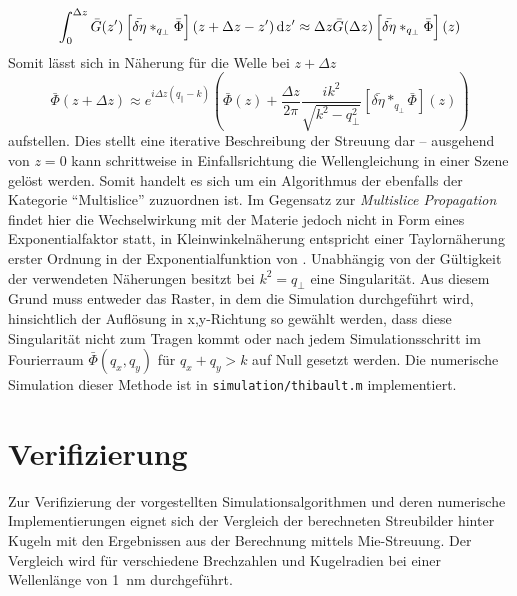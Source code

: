 \begin{equation}
	\int_{0}^{\Delta z} \bar{G}(z')\left[\bar{\delta\eta}\ast_{q_\perp} \bar{\Phi}\right](z+\Delta z-z')\dif z'
	\approx
	\Delta z \bar{G}(\Delta z)\left[\bar{\delta\eta}\ast_{q_\perp} \bar{\Phi}\right](z)
\end{equation}
Somit lässt sich in Näherung für die Welle bei $z+\Delta z$
\begin{equation}
	\label{eq:thibault}
	\bar{\Phi}(z+\Delta z)
	\approx
	e^{i\Delta z(q_\parallel-k)}
	\left(
	\bar{\Phi}(z)+\frac{\Delta z}{2\pi}\frac{ik^2}{\sqrt{k^2-q^2_\perp}}  \left[\bar{\delta\eta}\ast_{q_\perp} \bar{\Phi}\right](z)
	\right)
\end{equation}
aufstellen. Dies stellt eine iterative Beschreibung der Streuung dar -- ausgehend von $z=0$ kann schrittweise in Einfallsrichtung die Wellengleichung in einer Szene gelöst werden. Somit handelt es sich um ein Algorithmus der ebenfalls der Kategorie "`Multislice"' zuzuordnen ist. Im Gegensatz zur \textit{Multislice Propagation} findet hier die Wechselwirkung mit der Materie jedoch nicht in Form eines Exponentialfaktor statt, in Kleinwinkelnäherung entspricht  einer Taylornäherung erster Ordnung in der Exponentialfunktion von . Unabhängig von der Gültigkeit der verwendeten Näherungen besitzt  bei $k^2=q_\perp$ eine Singularität. Aus diesem Grund muss entweder das Raster, in dem die Simulation durchgeführt wird, hinsichtlich der Auflösung in x,y-Richtung so gewählt werden, dass diese Singularität nicht zum Tragen kommt oder nach jedem Simulationsschritt im Fourierraum $\bar{\Phi}(q_x,q_y)$ für $q_x+q_y>k$ auf Null gesetzt werden.
Die numerische Simulation dieser Methode ist in \texttt{simulation/thibault.m} implementiert.


\section{Verifizierung}
Zur Verifizierung der vorgestellten Simulationsalgorithmen und deren numerische Implementierungen eignet sich der Vergleich der berechneten Streubilder hinter Kugeln mit den Ergebnissen aus der Berechnung mittels Mie-Streuung. Der Vergleich wird für verschiedene Brechzahlen und Kugelradien bei einer Wellenlänge von \SI{1}{nm} durchgeführt.

